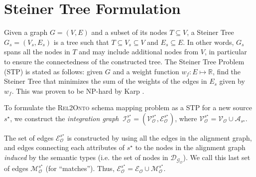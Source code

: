 \documentclass[letterpaper]{article} %
\newcommand{\authornote}[3]{
  {\fbox{\sc 
  #1}:$\blacktriangleright$\textcolor{#2}{\small{#3}}$\blacktriangleleft$}%
}
\newcommand{\ddg}[1]{\authornote{DDG}{blue}{#1}}
\newcommand{\npr}[1]{\authornote{NPR}{orange}{#1}}
\newcommand{\relonto}{\textsc{Rel2Onto}}
\begin{document}
% 
 

\section{Steiner Tree Formulation \label{SEC:STP}}

Given a graph $G =
(V, E)$ and a subset of its nodes $T \subseteq V$, a 
Steiner Tree $G_s = (V_s, E_s )$ is a tree such that $T \subseteq V_s \subseteq 
V$ and $E_s \subseteq E$. In other words, $G_s$ spans all the nodes in $T$ and 
may include additional nodes from $V$, in particular to ensure the 
connectedness of the constructed tree. The Steiner Tree Problem 
(STP) is stated as follows: given $G$ and a weight function $w_f : E 
\mapsto \mathbb{R}$, find the Steiner Tree that minimizes the sum of the 
weights of the edges in $E_s$ given by $w_f$. This was proven to be NP-hard 
by Karp \cite{Karp1972}.

To formulate the \relonto{} schema mapping problem as a STP for a new source 
$s^\star$, we construct the 
\emph{integration graph} $~\mathcal{I}_\mathcal{O}^{s^\star} = 
(\mathcal{V}_\mathcal{O}^{s^\star},\mathcal{E}_\mathcal{O}^{s^\star})$, where  
$\mathcal{V}_\mathcal{O}^{s^\star} = \mathcal{V_O} \cup 
\mathcal{A}_{s^\star}$.

The set of edges $\mathcal{E}_\mathcal{O}^{s^\star}$ is constructed by using 
all the edges in the alignment 
graph, and edges connecting each attributes of $s^\star$ to the nodes in the 
alignment graph \emph{induced} by the semantic types (i.e. the set of nodes in 
$\mathcal{D_{G_O}}$). We call this last set 
of edges $\mathcal{M}_\mathcal{O}^{s^\star}$ (for ``matches''). Thus, 
$\mathcal{E}_\mathcal{O}^{s^\star} = 
\mathcal{E_O} \cup \mathcal{M}_\mathcal{O}^{s^\star}$.
\end{document}
